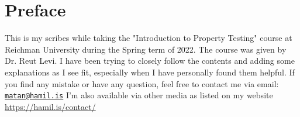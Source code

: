 \chapter*{Preface}

This is my scribes while taking the "Introduction to Property Testing" course at Reichman University during the Spring term of 2022.
The course was given by Dr. Reut Levi.
I have been trying to closely follow the contents and adding some explanations as I see fit, especially when I have personally found them helpful.
If you find any mistake or have any question, feel free to contact me via email: \href{mailto:matan@hamil.is}{\texttt{matan@hamil.is}}
I'm also available via other media as listed on my website \url{https://hamil.is/contact/}